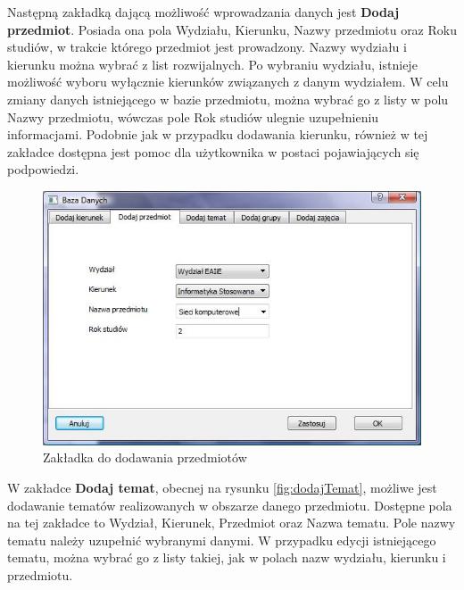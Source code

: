 Następną zakładką dającą możliwość wprowadzania danych jest \textbf{Dodaj przedmiot}. Posiada ona pola Wydziału, Kierunku, Nazwy przedmiotu oraz Roku studiów, w trakcie którego przedmiot jest prowadzony. Nazwy wydziału i kierunku można wybrać z list rozwijalnych. Po wybraniu wydziału, istnieje możliwość wyboru wyłącznie kierunków związanych z danym wydziałem. W celu zmiany danych istniejącego w bazie przedmiotu, można wybrać go z listy w polu Nazwy przedmiotu, wówczas pole Rok studiów ulegnie uzupełnieniu informacjami. Podobnie jak w przypadku dodawania kierunku, również w tej zakładce dostępna jest pomoc dla użytkownika w postaci pojawiających się podpowiedzi. 

\begin{figure}
\begin{center}
\includegraphics[scale=0.7]{dodaj_przedmiot.jpg}
\caption{Zakładka do dodawania przedmiotów}
\label{fig:dodajPrzedmiot}
\end{center}
\end{figure}

W zakładce \textbf{Dodaj temat}, obecnej na rysunku \ref{fig:dodajTemat}, możliwe jest dodawanie tematów realizowanych w obszarze danego przedmiotu. Dostępne pola na tej zakładce to Wydział, Kierunek, Przedmiot oraz Nazwa tematu. Pole nazwy tematu należy uzupełnić wybranymi danymi. W przypadku edycji istniejącego tematu, można wybrać go z listy takiej, jak w polach nazw wydziału, kierunku i przedmiotu.

